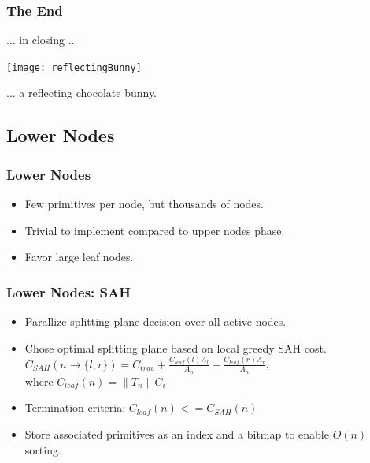 \documentclass{beamer}
\begin{document}
\begin{frame}
  \frametitle{The End}
  \begin{center}
  ... in closing ...

  \texttt{[image: reflectingBunny]}

  ... a reflecting chocolate bunny.
  \end{center}
\end{frame}

\appendix
\subsection*{Lower Nodes}
\begin{frame}
  \frametitle{Lower Nodes}
  \begin{itemize}
    \item Few primitives per node, but thousands of nodes.
    \item Trivial to implement compared to upper nodes phase.
    \item Favor large leaf nodes.
  \end{itemize}
\end{frame}

\begin{frame}
    \frametitle{Lower Nodes: SAH}
    \begin{itemize}
    \item Parallize splitting plane decision over all active nodes.
    \item Chose optimal splitting plane based on local greedy SAH cost.\\
      $C_{SAH}(n \rightarrow \{l, r\}) = C_{trav} + \frac{C_{leaf}(l) A_l}{A_n} +
      \frac{C_{leaf}(r) A_r}{A_n}$, \\
      where $C_{leaf}(n) = \|T_n\| C_i$
    \item Termination criteria: $C_{leaf}(n) <= C_{SAH}(n)$
    \item Store associated primitives as an index and a bitmap to enable
      $O(n)$ sorting.
    \end{itemize}
\end{frame}
\end{document}
